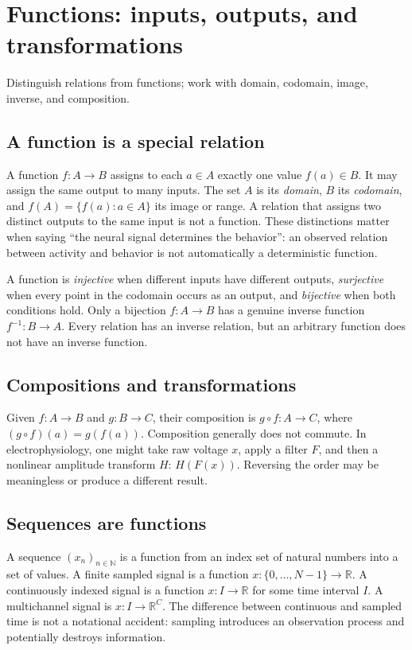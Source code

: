 \chapter{Functions: inputs, outputs, and transformations}\label{ch:functions}
\begin{readergoal}Distinguish relations from functions; work with domain, codomain, image, inverse, and composition.\end{readergoal}
\section{A function is a special relation}
A function $f:A\to B$ assigns to each $a\in A$ exactly one value $f(a)\in B$. It may assign the same output to many inputs. The set $A$ is its \emph{domain}, $B$ its \emph{codomain}, and $f(A)=\{f(a):a\in A\}$ its image or range. A relation that assigns two distinct outputs to the same input is not a function. These distinctions matter when saying ``the neural signal determines the behavior'': an observed relation between activity and behavior is not automatically a deterministic function.

A function is \emph{injective} when different inputs have different outputs, \emph{surjective} when every point in the codomain occurs as an output, and \emph{bijective} when both conditions hold. Only a bijection $f:A\to B$ has a genuine inverse function $f^{-1}:B\to A$. Every relation has an inverse relation, but an arbitrary function does not have an inverse function.

\section{Compositions and transformations}
Given $f:A\to B$ and $g:B\to C$, their composition is $g\circ f:A\to C$, where $(g\circ f)(a)=g(f(a))$. Composition generally does not commute. In electrophysiology, one might take raw voltage $x$, apply a filter $F$, and then a nonlinear amplitude transform $H$: $H(F(x))$. Reversing the order may be meaningless or produce a different result.

\section{Sequences are functions}
A sequence $(x_n)_{n\in\mathbb N}$ is a function from an index set of natural numbers into a set of values. A finite sampled signal is a function $x:\{0,\ldots,N-1\}\to\mathbb R$. A continuously indexed signal is a function $x:I\to\mathbb R$ for some time interval $I$. A multichannel signal is $x:I\to\mathbb R^C$. The difference between continuous and sampled time is not a notational accident: sampling introduces an observation process and potentially destroys information.

